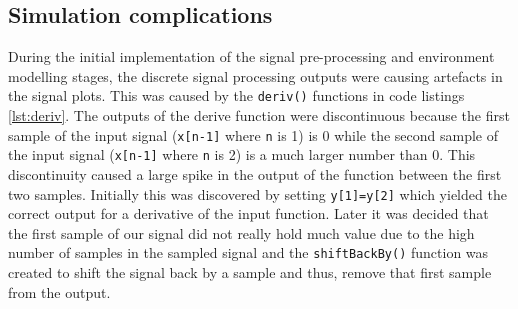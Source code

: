 \subsection{Simulation complications}
During the initial implementation of the signal pre-processing and environment modelling stages, the discrete signal processing outputs were causing artefacts in the signal plots. This was caused by the \texttt{deriv()} functions in code listings \ref{lst:deriv}. The outputs of the derive function were discontinuous because the first sample of the input signal (\texttt{x[n-1]} where \texttt{n} is 1) is 0 while the second sample of the input signal (\texttt{x[n-1]} where \texttt{n} is 2) is a much larger number than 0. This discontinuity caused a large spike in the output of the function between the first two samples. Initially this was discovered by setting \texttt{y[1]=y[2]} which yielded the correct output for a derivative of the input function. Later it was decided that the first sample of our signal did not really hold much value due to the high number of samples in the sampled signal and the \texttt{shiftBackBy()} function was created to shift the signal back by a sample and thus, remove that first sample from the output.
